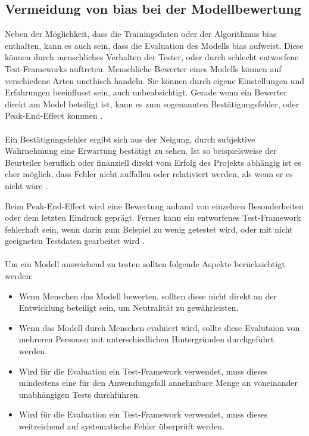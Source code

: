 \documentclass[hidelinks,12pt]{report}
\begin{document}
\subsection{Vermeidung von \Gls{bias}  bei der Modellbewertung}
Neben der Möglichkeit, dass die Trainingsdaten oder der Algorithmus \Gls{bias}  enthalten, kann es auch sein, dass die Evaluation des Modells \Gls{bias}  aufweist.
Diese können durch menschliches Verhalten der Tester, oder durch schlecht entworfene Test-Frameworks auftreten. Menschliche Bewerter eines Modells können auf verschiedene Arten unethisch handeln. Sie können durch eigene Einstellungen und Erfahrungen beeinflusst sein, auch unbeabsichtigt. Gerade wenn ein Bewerter direkt am Model beteiligt ist, kann es zum sogenannten Bestätigungsfehler, oder \glqq Peak-End-Effect\grqq{} kommen \cite[S. 54f.]{Srinivasan}. 
\\\\
Ein Bestätigungsfehler ergibt sich aus der Neigung, durch subjektive Wahrnehmung eine Erwartung bestätigt zu sehen. Ist so beispielsweise der Beurteiler beruflich oder finanziell direkt vom Erfolg des Projekts abhängig ist es eher möglich, dass Fehler nicht auffallen oder relativiert werden, als wenn er es nicht wäre \cite[S. 54f.]{Srinivasan}.

\newpage

Beim \glqq Peak-End-Effect\grqq{} wird eine Bewertung anhand von einzelnen Besonderheiten oder dem letzten Eindruck geprägt. Ferner kann ein entworfenes Test-Framework fehlerhaft sein, wenn darin zum Beispiel zu wenig getestet wird, oder mit nicht geeigneten Testdaten gearbeitet wird \cite[S. 54f.]{Srinivasan}.
\\\\
Um ein Modell ausreichend zu testen sollten folgende Aspekte berücksichtigt werden:%
\\
\begin{itemize}
	\item Wenn Menschen das Modell bewerten, sollten diese nicht direkt an der Entwicklung beteiligt sein, um Neutralität zu gewährleisten.
	\item Wenn das Modell durch Menschen evaluiert wird, sollte diese Evalutaion von mehreren Personen mit unterschiedlichen Hintergründen durchgeführt werden.
	\item Wird für die Evaluation ein Test-Framework verwendet, muss dieses mindestens eine für den Anwendungsfall annehmbare Menge an voneinander unabhängigen Tests durchführen.
	\item Wird für die Evaluation ein Test-Framework verwendet, muss dieses weitreichend auf systematische Fehler überprüft werden.
\end{itemize}
\end{document}
